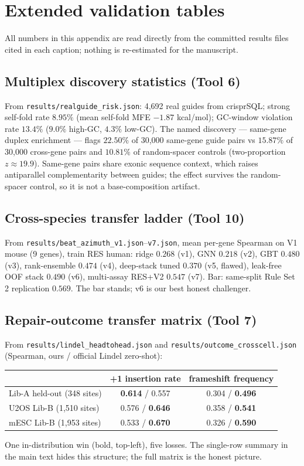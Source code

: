 \section{Extended validation tables}
All numbers in this appendix are read directly from the committed results
files cited in each caption; nothing is re-estimated for the manuscript.

\subsection{Multiplex discovery statistics (Tool 6)}
From \texttt{results/realguide\_risk.json}: 4{,}692 real guides from
crisprSQL; strong self-fold rate $8.95\%$ (mean self-fold MFE $-1.87$
kcal/mol); GC-window violation rate $13.4\%$ ($9.0\%$ high-GC, $4.3\%$
low-GC). The named discovery --- same-gene duplex enrichment --- flags
$22.50\%$ of 30{,}000 same-gene guide pairs vs $15.87\%$ of 30{,}000
cross-gene pairs and $10.81\%$ of random-spacer controls (two-proportion
$z \approx 19.9$). Same-gene pairs share exonic sequence context, which
raises antiparallel complementarity between guides; the effect survives
the random-spacer control, so it is not a base-composition artifact.

\subsection{Cross-species transfer ladder (Tool 10)}
From \texttt{results/beat\_azimuth\_v1.json}--\texttt{v7.json}, mean
per-gene Spearman on V1 mouse (9 genes), train RES human:
ridge $0.268$ (v1), GNN $0.218$ (v2), GBT $0.480$ (v3), rank-ensemble
$0.474$ (v4), deep-stack tuned $0.370$ (v5, flawed), leak-free OOF stack
$0.490$ (v6), multi-assay RES+V2 $0.547$ (v7). Bar: same-split Rule Set 2
replication $0.569$. The bar stands; v6 is our best honest challenger.

\subsection{Repair-outcome transfer matrix (Tool 7)}
From \texttt{results/lindel\_headtohead.json} and
\texttt{results/outcome\_crosscell.json} (Spearman, ours / official
Lindel zero-shot):
\begin{center}
\begin{tabular}{l|cc}
 & +1 insertion rate & frameshift frequency \\\hline
Lib-A held-out (348 sites) & \textbf{0.614} / 0.557 & 0.304 / \textbf{0.496} \\
U2OS Lib-B (1{,}510 sites) & 0.576 / \textbf{0.646} & 0.358 / \textbf{0.541} \\
mESC Lib-B (1{,}953 sites) & 0.533 / \textbf{0.670} & 0.326 / \textbf{0.590} \\
\end{tabular}
\end{center}
One in-distribution win (bold, top-left), five losses. The single-row
summary in the main text hides this structure; the full matrix is the
honest picture.

